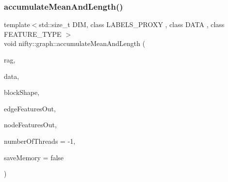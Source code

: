 \subsubsection{\texorpdfstring{accumulate\+Mean\+And\+Length()}{accumulateMeanAndLength()}}
{\footnotesize\ttfamily template$<$std\+::size\+\_\+t D\+IM, class L\+A\+B\+E\+L\+S\+\_\+\+P\+R\+O\+XY , class D\+A\+TA , class F\+E\+A\+T\+U\+R\+E\+\_\+\+T\+Y\+PE $>$ \\
void nifty\+::graph\+::accumulate\+Mean\+And\+Length (\begin{DoxyParamCaption}\item[{const \hyperlink{classnifty_1_1graph_1_1GridRag}{Grid\+Rag}$<$ D\+IM, L\+A\+B\+E\+L\+S\+\_\+\+P\+R\+O\+XY $>$ \&}]{rag,  }\item[{const D\+A\+TA \&}]{data,  }\item[{const \hyperlink{namespacenifty_1_1array_a683f151f19c851754e0c6d55ed16a0c2}{array\+::\+Static\+Array}$<$ int64\+\_\+t, D\+IM $>$ \&}]{block\+Shape,  }\item[{\hyperlink{classandres_1_1View}{marray\+::\+View}$<$ F\+E\+A\+T\+U\+R\+E\+\_\+\+T\+Y\+PE $>$ \&}]{edge\+Features\+Out,  }\item[{\hyperlink{classandres_1_1View}{marray\+::\+View}$<$ F\+E\+A\+T\+U\+R\+E\+\_\+\+T\+Y\+PE $>$ \&}]{node\+Features\+Out,  }\item[{const int}]{number\+Of\+Threads = {\ttfamily -\/1},  }\item[{const bool}]{save\+Memory = {\ttfamily false} }\end{DoxyParamCaption})}

\mbox{\label{namespacenifty_1_1graph_a2cfa949da8b5193deb5fb6d898154e23}} 
